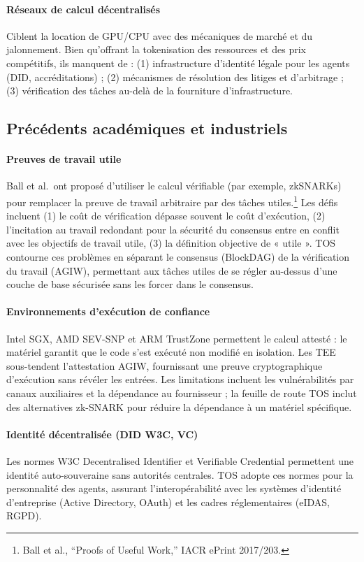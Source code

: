 \documentclass[11pt]{article}
\begin{document}
\paragraph{Réseaux de calcul décentralisés} Ciblent la location de GPU/CPU avec des mécaniques de marché et du jalonnement. Bien qu'offrant la tokenisation des ressources et des prix compétitifs, ils manquent de : (1) infrastructure d'identité légale pour les agents (DID, accréditations) ; (2) mécanismes de résolution des litiges et d'arbitrage ; (3) vérification des tâches au-delà de la fourniture d'infrastructure.

\subsection{Précédents académiques et industriels}
\paragraph{Preuves de travail utile} Ball et al.\ ont proposé d'utiliser le calcul vérifiable (par exemple, zkSNARKs) pour remplacer la preuve de travail arbitraire par des tâches utiles.\footnote{Ball et al., ``Proofs of Useful Work,'' IACR ePrint 2017/203.} Les défis incluent (1) le coût de vérification dépasse souvent le coût d'exécution, (2) l'incitation au travail redondant pour la sécurité du consensus entre en conflit avec les objectifs de travail utile, (3) la définition objective de « utile ». TOS contourne ces problèmes en séparant le consensus (BlockDAG) de la vérification du travail (AGIW), permettant aux tâches utiles de se régler au-dessus d'une couche de base sécurisée sans les forcer dans le consensus.

\paragraph{Environnements d'exécution de confiance} Intel SGX, AMD SEV-SNP et ARM TrustZone permettent le calcul attesté : le matériel garantit que le code s'est exécuté non modifié en isolation. Les TEE sous-tendent l'attestation AGIW, fournissant une preuve cryptographique d'exécution sans révéler les entrées. Les limitations incluent les vulnérabilités par canaux auxiliaires et la dépendance au fournisseur ; la feuille de route TOS inclut des alternatives zk-SNARK pour réduire la dépendance à un matériel spécifique.

\paragraph{Identité décentralisée (DID W3C, VC)} Les normes W3C Decentralised Identifier et Verifiable Credential permettent une identité auto-souveraine sans autorités centrales. TOS adopte ces normes pour la personnalité des agents, assurant l'interopérabilité avec les systèmes d'identité d'entreprise (Active Directory, OAuth) et les cadres réglementaires (eIDAS, RGPD).
\end{document}
